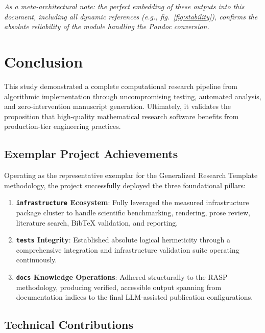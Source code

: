 \documentclass[
]{article}
\providecommand{\tightlist}{%
  \setlength{\itemsep}{0pt}\setlength{\parskip}{0pt}}
\begin{document}
\emph{As a meta-architectural note: the perfect embedding of these
outputs into this document, including all dynamic references (e.g.,
fig.~\ref{fig:stability}), confirms the absolute reliability of the
 module handling the
Pandoc conversion.}

\newpage

\section{Conclusion}\label{sec:conclusion}

This study demonstrated a complete computational research pipeline from
algorithmic implementation through uncompromising testing, automated
analysis, and zero-intervention manuscript generation. Ultimately, it
validates the proposition that high-quality mathematical research
software benefits from production-tier engineering practices.

\subsection{Exemplar Project
Achievements}\label{exemplar-project-achievements}

Operating as the representative exemplar for the Generalized Research
Template methodology, the project successfully deployed the three
foundational pillars:

\begin{enumerate}
\def\labelenumi{\arabic{enumi}.}
\tightlist
\item
  \textbf{\texttt{infrastructure} Ecosystem}: Fully leveraged the
  measured infrastructure package cluster to handle scientific
  benchmarking, rendering, prose review, literature search, BibTeX
  validation, and reporting.
\item
  \textbf{\texttt{tests} Integrity}: Established absolute logical
  hermeticity through a comprehensive integration and infrastructure
  validation suite operating continuously.
\item
  \textbf{\texttt{docs} Knowledge Operations}: Adhered structurally to
  the RASP methodology, producing verified, accessible output spanning
  from documentation indices to the final LLM-assisted publication
  configurations.
\end{enumerate}

\subsection{Technical Contributions}\label{technical-contributions}
\end{document}
